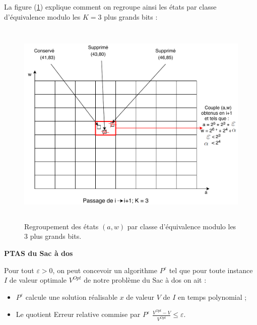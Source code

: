 La figure (\ref{Regroupement_Etats}) explique comment on regroupe ainsi les états par classe d'équivalence modulo les $K = 3$ plus grands bits :

\begin{figure}[H]
	\centerline{
		\includegraphics[height=10cm]{images_these/Regroupement_Etats.pdf}}
	\caption[Regroupement des états. ]{Regroupement des états $(a, w)$ par classe d'équivalence modulo les 3 plus grands bits.}
	\label{Regroupement_Etats}
\end{figure}

\begin{theo}{\textbf{PTAS du Sac à dos}}
	\label{dem_PTAS}
	
	Pour tout $\varepsilon > 0$, on peut concevoir un algorithme $P^{\varepsilon}$ tel que pour toute instance $I$ de valeur optimale $V^{Opt}$ de notre problème du Sac à dos on ait :
	\begin{itemize}[label=$\square$]
		\item $P^{\varepsilon}$ calcule une solution réalisable $x$ de valeur $V$ de $I$ en temps polynomial ;
		\item Le quotient \og Erreur relative commise par $P^{\varepsilon}$ \fg{}  ${\displaystyle {\frac {V^{Opt}-V}{V^{Opt}}}} \leq \varepsilon$.
		\end{itemize}
	
\end{theo}


